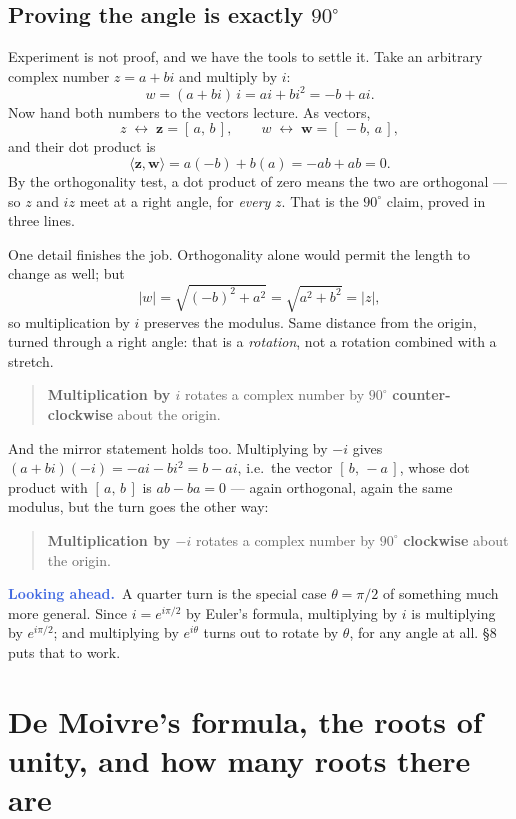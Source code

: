 \documentclass[11pt]{article}
\theoremstyle{definition}
\theoremstyle{remark}
\newcommand{\lookahead}{\par\smallskip\noindent
  \textbf{\sffamily\textcolor{RoyalBlue}{Looking ahead.}}\ \ignorespaces}
\newcommand{\vc}[1]{\mathbf{#1}}
\begin{document}
\subsection*{Proving the angle is exactly $90^{\circ}$}
Experiment is not proof, and we have the tools to settle it. Take an arbitrary
complex number $z=a+bi$ and multiply by $i$:
\[
  w = (a+bi)\,i = ai + bi^{2} = -b + ai .
\]
Now hand both numbers to the vectors lecture. As vectors,
\[
  z \;\longleftrightarrow\; \vc{z}=[\,a,\,b\,],
  \qquad
  w \;\longleftrightarrow\; \vc{w}=[\,-b,\,a\,],
\]
and their dot product is
\[
  \langle \vc{z},\vc{w}\rangle
  = a(-b) + b(a)
  = -ab + ab
  = 0 .
\]
By the orthogonality test, a dot product of zero means the two are orthogonal
--- so $z$ and $iz$ meet at a right angle, for \emph{every} $z$. That is the
$90^{\circ}$ claim, proved in three lines.

One detail finishes the job. Orthogonality alone would permit the length to
change as well; but
\[
  \lvert w\rvert = \sqrt{(-b)^{2}+a^{2}} = \sqrt{a^{2}+b^{2}} = \lvert z\rvert ,
\]
so multiplication by $i$ preserves the modulus. Same distance from the origin,
turned through a right angle: that is a \emph{rotation}, not a rotation combined
with a stretch.

\begin{quote}
\textbf{Multiplication by $i$} rotates a complex number by $90^{\circ}$
\textbf{counter-clockwise} about the origin.
\end{quote}

\noindent And the mirror statement holds too. Multiplying by $-i$ gives
$(a+bi)(-i) = -ai - bi^{2} = b - ai$, i.e.\ the vector $[\,b,\,-a\,]$, whose dot
product with $[\,a,\,b\,]$ is $ab-ba=0$ --- again orthogonal, again the same
modulus, but the turn goes the other way:

\begin{quote}
\textbf{Multiplication by $-i$} rotates a complex number by $90^{\circ}$
\textbf{clockwise} about the origin.
\end{quote}

\lookahead A quarter turn is the special case $\theta=\pi/2$ of something much
more general. Since $i=e^{i\pi/2}$ by Euler's formula, multiplying by $i$ is
multiplying by $e^{i\pi/2}$; and multiplying by $e^{i\theta}$ turns out to
rotate by $\theta$, for any angle at all. \S8 puts that to work.

\section{De Moivre's formula, the roots of unity, and how many roots there are}
\end{document}
